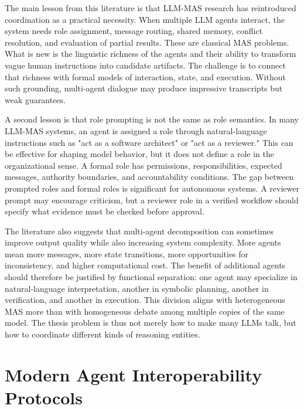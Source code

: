 The main lesson from this literature is that LLM-MAS research has reintroduced coordination as a practical necessity. When multiple LLM agents interact, the system needs role assignment, message routing, shared memory, conflict resolution, and evaluation of partial results. These are classical MAS problems. What is new is the linguistic richness of the agents and their ability to transform vague human instructions into candidate artifacts. The challenge is to connect that richness with formal models of interaction, state, and execution. Without such grounding, multi-agent dialogue may produce impressive transcripts but weak guarantees.

A second lesson is that role prompting is not the same as role semantics. In many LLM-MAS systems, an agent is assigned a role through natural-language instructions such as "act as a software architect" or "act as a reviewer." This can be effective for shaping model behavior, but it does not define a role in the organizational sense. A formal role has permissions, responsibilities, expected messages, authority boundaries, and accountability conditions. The gap between prompted roles and formal roles is significant for autonomous systems. A reviewer prompt may encourage criticism, but a reviewer role in a verified workflow should specify what evidence must be checked before approval.

The literature also suggests that multi-agent decomposition can sometimes improve output quality while also increasing system complexity. More agents mean more messages, more state transitions, more opportunities for inconsistency, and higher computational cost. The benefit of additional agents should therefore be justified by functional separation: one agent may specialize in natural-language interpretation, another in symbolic planning, another in verification, and another in execution. This division aligns with heterogeneous MAS more than with homogeneous debate among multiple copies of the same model. The thesis problem is thus not merely how to make many LLMs talk, but how to coordinate different kinds of reasoning entities.

\section{Modern Agent Interoperability Protocols}

